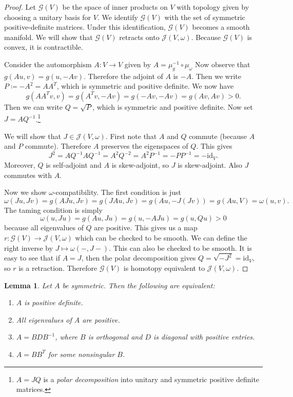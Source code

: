 \documentclass[leqno, openany]{memoir}
\newtheorem{lem}[thm]{Lemma}
\theoremstyle{definition}
\theoremstyle{remark}
\theoremstyle{plain}
\theoremstyle{definition}
\theoremstyle{remark}
\newcommand{\mc}[1]{\mathcal{#1}}
\newcommand{\mr}[1]{\mathrm{#1}}
\begin{document}
\begin{proof} Let $\mc{G}(V)$ be the space of inner products on $V$ with
    topology given by choosing a unitary basis for $V$. We identify $\mc{G}(V)$
    with the set of symmetric positive-definite matrices. Under this
    identification, $\mc{G}(V)$ becomes a smooth manifold. We will show that
    $\mc{G}(V)$ retracts onto $\mc{J}(V, \omega)$. Because $\mc{G}(V)$ is
    convex, it is contractible.

    Consider the automorphism $A:V \to V$ given by $A = \mu_{g}^{-1} \circ
    \mu_{\omega}$ Now observe that $g(Au, v) = g(u, -Av)$. Therefore the
    adjoint of $A$ is $-A$. Then we write $P \coloneqq -A^2 = AA^T$, which is
    symmetric and positive definite. We now have \[ g(AA^Tv, v) = g(A^T v, -Av)
    = g(-Av, -Av) = g(Av, Av) > 0. \] Then we can write $Q = \sqrt{P}$, which
    is symmetric and positive definite. Now set $J = AQ^{-1}$.\footnote{$A =
    JQ$ is a \textit{polar decomposition} into unitary and symmetric positive
definite matrices.}

    We will show that $J \in \mc{J}(V, \omega)$. First note that $A$ and $Q$
    commute (because $A$ and $P$ commute). Therefore $A$ preserves the
    eigenspaces of $Q$. This gives \[ J^2 = AQ^{-1}AQ^{-1} = A^2Q^{-2} =
    A^2P^{-1} = -P P^{-1} = - \mr{id}_V.\] Moreover, $Q$ is self-adjoint and
    $A$ is skew-adjoint, so $J$ is skew-adjoint. Also $J$ commutes with $A$. 

    Now we show $\omega$-compatibility. The first condition is just \[
        \omega(Ju, Jv) = g(AJu, Jv) = g(JAu, Jv) = g(Au, -J(Jv)) = g(Au, V) =
        \omega(u,v).\] The taming condition is simply \[ \omega(u, Ju) = g(Au,
    Ju) = g(u, -AJu) = g(u, Qu) > 0 \] because all eigenvalues of $Q$ are
    positive. This gives us a map $r: \mc{G}(V) \to \mc{J}(V, \omega)$ which
    can be checked to be smooth. We can define the right inverse by $J \mapsto
    \omega(-, J-)$. This can also be checked to be smooth. It is easy to see
    that if $A = J$, then the polar decomposition gives $Q = \sqrt{-J^2} =
    \mr{id}_V$, so $r$ is a retraction. Therefore $\mc{G}(V)$ is homotopy
    equivalent to $\mc{J}(V, \omega)$.  \end{proof}

\begin{lem} Let $A$ be symmetric. Then the following are equivalent:
    \begin{enumerate} \item $A$ is positive definite.  \item All eigenvalues of
        $A$ are positive.  \item $A = BDB^{-1}$, where $B$ is orthogonal and
        $D$ is diagonal with positive entries.  \item $A = BB^T$ for some
nonsingular $B$.  \end{enumerate} \end{lem}
\end{document}
